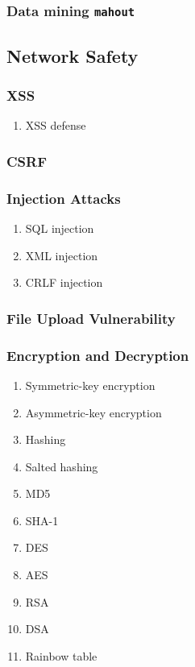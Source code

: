 \documentclass[11pt, twocolumn]{article}
\begin{document}
\subsubsection{Data mining \texttt{mahout}}

\subsection{Network Safety}

\subsubsection{XSS}
\begin{enumerate}
	\item XSS defense
\end{enumerate}

\subsubsection{CSRF}

\subsubsection{Injection Attacks}
\begin{enumerate}
	\item SQL injection
	\item XML injection
	\item CRLF injection
\end{enumerate}

\subsubsection{File Upload Vulnerability}

\subsubsection{Encryption and Decryption}
\begin{enumerate}
	\item Symmetric-key encryption
	\item Asymmetric-key encryption
	\item Hashing
	\item Salted hashing
	\item MD5
	\item SHA-1
	\item DES
	\item AES
	\item RSA
	\item DSA
	\item Rainbow table
\end{enumerate}
\end{document}

